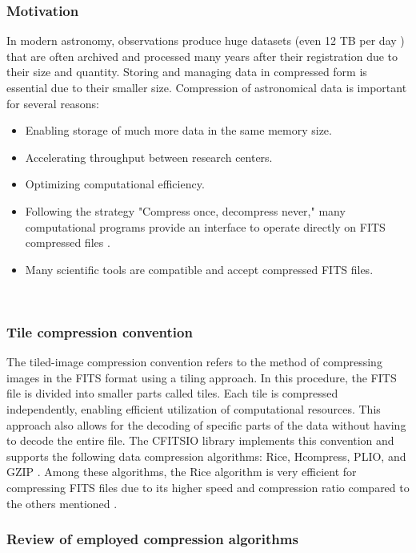 \documentclass[licencjacka,en]{pracamgr}
\begin{document}
\subsubsection{Motivation}
In modern astronomy, observations produce huge datasets (even 12 TB per day \cite{crayondata} ) that are often archived and processed many years after their registration due to their size and quantity. Storing and managing data in compressed form is essential due to their smaller size. Compression of astronomical data is important for several reasons:
\begin{itemize}
\item Enabling storage of much more data in the same memory size.
\item Accelerating throughput between research centers.
\item Optimizing computational efficiency.
\item Following the strategy "Compress once, decompress never," many computational programs provide an interface to operate directly on FITS compressed files \cite{why-rice}. 
\item Many scientific tools are compatible and accept compressed FITS files.
\end{itemize}\\

\subsubsection{Tile compression convention}

The tiled-image compression convention refers to the method of compressing images in the FITS format using a tiling approach. In this procedure, the FITS file is divided into smaller parts called tiles. Each tile is compressed independently, enabling efficient utilization of computational resources. This approach also allows for the decoding of specific parts of the data without having to decode the entire file. The CFITSIO library implements this convention and supports the following data compression algorithms: Rice, Hcompress, PLIO, and GZIP \cite{rice-comp}. Among these algorithms, the Rice algorithm is very efficient \cite{fpack} for compressing FITS files due to its higher speed and compression ratio compared to the others mentioned \cite{rice-comp}.

\subsubsection{Review of employed compression algorithms}
\end{document}
